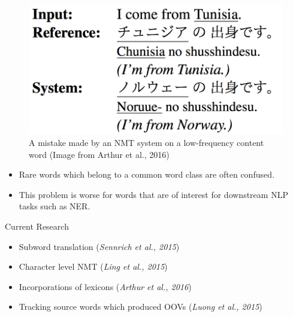 \documentclass[landscape]{jhuslides3C}
\begin{document}
\begin{figure}
\begin{center}
\includegraphics[scale=0.3]{images/rare.png}
\caption{A mistake made by an NMT system on a low-frequency content word ({\tiny Image from Arthur et al., 2016})}
\end{center}
\end{figure}
\begin{itemize}
\item Rare words which belong to a common word class are often confused.
\item This problem is worse for words that are of interest for downstream NLP tasks such as NER.
\end{itemize}

\vspace{10mm}
Current Research
\begin{itemize}
\item Subword translation (\textit{Sennrich et al., 2015})
\item Character level NMT (\textit{Ling et al., 2015})
\item Incorporations of lexicons (\textit{Arthur et al., 2016})
\item Tracking source words which produced OOVs (\textit{Luong et al., 2015})
\end{itemize}
\end{document}
